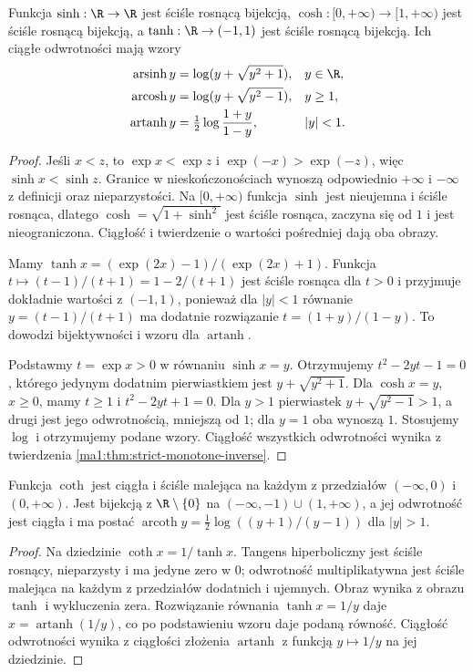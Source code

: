 \begin{twierdzenie}
\label{ma1:thm:hyperbolic-inverse}
Funkcja $\sinh:\R\to\R$ jest ściśle rosnącą bijekcją, $\cosh:[0,+\infty)\to[1,+\infty)$ jest ściśle rosnącą bijekcją, a $\tanh:\R\to(-1,1)$ jest ściśle rosnącą bijekcją. Ich ciągłe odwrotności mają wzory
\begin{align*}
 \operatorname{arsinh}y&=\log(y+\sqrt{y^2+1}), &&y\in\R,\\
 \operatorname{arcosh}y&=\log(y+\sqrt{y^2-1}), &&y\ge1,\\
 \operatorname{artanh}y&=\tfrac12\log\frac{1+y}{1-y}, &&|y|<1.
\end{align*}
\end{twierdzenie}
\begin{proof}
Jeśli $x<z$, to $\exp x<\exp z$ i $\exp(-x)>\exp(-z)$, więc $\sinh x<\sinh z$. Granice w nieskończonościach wynoszą odpowiednio $+\infty$ i $-\infty$ z definicji oraz nieparzystości. Na $[0,+\infty)$ funkcja $\sinh$ jest nieujemna i ściśle rosnąca, dlatego $\cosh=\sqrt{1+\sinh^2}$ jest ściśle rosnąca, zaczyna się od $1$ i jest nieograniczona. Ciągłość i twierdzenie o wartości pośredniej dają oba obrazy.

Mamy $\tanh x=(\exp(2x)-1)/(\exp(2x)+1)$. Funkcja $t\mapsto(t-1)/(t+1)=1-2/(t+1)$ jest ściśle rosnąca dla $t>0$ i przyjmuje dokładnie wartości z $(-1,1)$, ponieważ dla $|y|<1$ równanie $y=(t-1)/(t+1)$ ma dodatnie rozwiązanie $t=(1+y)/(1-y)$. To dowodzi bijektywności i wzoru dla $\operatorname{artanh}$.

Podstawmy $t=\exp x>0$ w równaniu $\sinh x=y$. Otrzymujemy $t^2-2yt-1=0$, którego jedynym dodatnim pierwiastkiem jest $y+\sqrt{y^2+1}$. Dla $\cosh x=y$, $x\ge0$, mamy $t\ge1$ i $t^2-2yt+1=0$. Dla $y>1$ pierwiastek $y+\sqrt{y^2-1}>1$, a drugi jest jego odwrotnością, mniejszą od $1$; dla $y=1$ oba wynoszą $1$. Stosujemy $\log$ i otrzymujemy podane wzory. Ciągłość wszystkich odwrotności wynika z twierdzenia \ref{ma1:thm:strict-monotone-inverse}.
\end{proof}

\begin{wniosek}
\label{ma1:cor:hyperbolic-cotangent}
Funkcja $\coth$ jest ciągła i ściśle malejąca na każdym z przedziałów $(-\infty,0)$ i $(0,+\infty)$. Jest bijekcją z $\R\setminus\{0\}$ na $(-\infty,-1)\cup(1,+\infty)$, a jej odwrotność jest ciągła i ma postać
$\operatorname{arcoth}y=\tfrac12\log((y+1)/(y-1))$ dla $|y|>1$.
\end{wniosek}
\begin{proof}
Na dziedzinie $\coth x=1/\tanh x$. Tangens hiperboliczny jest ściśle rosnący, nieparzysty i ma jedyne zero w $0$; odwrotność multiplikatywna jest ściśle malejąca na każdym z przedziałów dodatnich i ujemnych. Obraz wynika z obrazu $\tanh$ i wykluczenia zera. Rozwiązanie równania $\tanh x=1/y$ daje $x=\operatorname{artanh}(1/y)$, co po podstawieniu wzoru daje podaną równość. Ciągłość odwrotności wynika z ciągłości złożenia $\operatorname{artanh}$ z funkcją $y\mapsto1/y$ na jej dziedzinie.
\end{proof}

